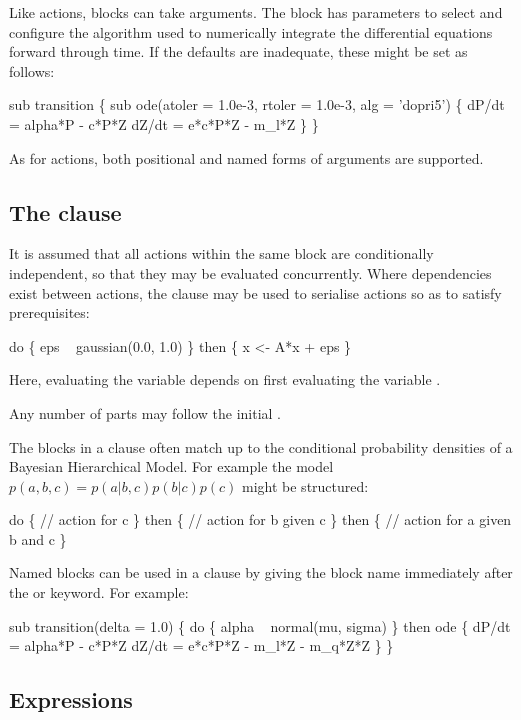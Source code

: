 Like actions, blocks can take arguments. The  block has
parameters to select and configure the algorithm used to numerically integrate
the differential equations forward through time. If the defaults are
inadequate, these might be set as follows:
\begin{bicode}
sub transition \{
  sub ode(atoler = 1.0e-3, rtoler = 1.0e-3, alg = 'dopri5') \{
    dP/dt = alpha*P - c*P*Z
    dZ/dt = e*c*P*Z - m_l*Z
  \}
\}
\end{bicode}
As for actions, both positional and named forms of arguments are supported.

\subsection{The  clause\label{do_then}}

It is assumed that all actions within the same block are conditionally
independent, so that they may be evaluated concurrently. Where dependencies
exist between actions, the  clause may be used to serialise
actions so as to satisfy prerequisites:
\begin{bicode}
do \{
  eps ~ gaussian(0.0, 1.0)
\} then \{
  x <- A*x + eps
\}
\end{bicode}
Here, evaluating the variable  depends on first evaluating the
variable .

Any number of  parts may follow the initial .

\begin{tip}
The blocks in a  clause often match up to
the conditional probability densities of a Bayesian Hierarchical Model. For
example the model $p(a,b,c) = p(a|b,c)p(b|c)p(c)$ might be structured:
\begin{bicode}
do \{
  // action for c
\} then \{
  // action for b given c
\} then \{
  // action for a given b and c
\}
\end{bicode}
\end{tip}

Named blocks can be used in a  clause by giving the block name
immediately after the  or  keyword. For example:
\begin{bicode}
sub transition(delta = 1.0) \{
  do \{
    alpha ~ normal(mu, sigma)
  \} then ode \{
    dP/dt = alpha*P - c*P*Z
    dZ/dt = e*c*P*Z - m_l*Z - m_q*Z*Z
  \}
\}
\end{bicode}

\subsection{Expressions\label{Expressions}}

